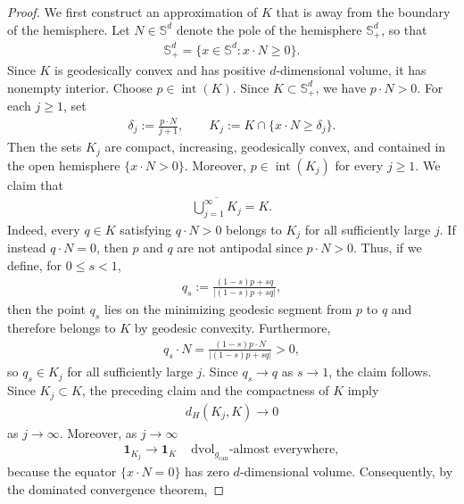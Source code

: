 \documentclass[11pt,reqno]{amsart}
\numberwithin{equation}{section}
\theoremstyle{definition}
\theoremstyle{remark}
\def\bS {\mathbb{S}}
\newcommand{\0}{\emptyset}
\newcommand{\can}{\mathrm{can}}
\newcommand{\dvol}{\,\mathrm{dvol}}
\begin{document}
\begin{proof}
We first construct an approximation of $K$ that is away from the boundary of the hemisphere. Let $N\in\bS^d$ denote the pole of the hemisphere $\bS^d_+$, so that
\begin{align}
        \bS^d_+
        =
        \{x\in\bS^d:x\cdot N\geq0\}.
\end{align}
Since $K$ is geodesically convex and has positive $d$-dimensional volume,
it has nonempty interior. Choose $p\in\operatorname{int}(K)$. Since $K\subset\bS^d_+$, we have
$p\cdot N>0$. For each $j\geq1$, set
\begin{align}
        \delta_j
        :=
        \frac{p\cdot N}{j+1},
        \qquad
        K_j
        :=
        K\cap\{x\cdot N\geq\delta_j\}.
\end{align}
Then the sets $K_j$ are compact, increasing, geodesically convex, and
contained in the open hemisphere $\{x\cdot N>0\}$. Moreover,
$p\in\operatorname{int}(K_j)$ for every $j\geq1$. We claim that
\begin{align}
        \overline{\bigcup_{j=1}^\infty K_j}
        =
        K.
\end{align}
Indeed, every $q\in K$ satisfying $q\cdot N>0$ belongs to $K_j$ for all
sufficiently large $j$. If instead $q\cdot N=0$, then $p$ and $q$ are not antipodal since $p\cdot N>0$. Thus, if we define, for $0\leq s<1$,
\begin{align}
        q_s
        :=
        \frac{(1-s)p+sq}{|(1-s)p+sq|},
\end{align}
then the point $q_s$ lies on the minimizing geodesic segment from $p$ to $q$ and
therefore belongs to $K$ by geodesic convexity. Furthermore,
\begin{align}
        q_s\cdot N
        =
        \frac{(1-s)p\cdot N}{|(1-s)p+sq|}
        >
        0,
\end{align}
so $q_s\in K_j$ for all sufficiently large $j$. Since $q_s\to q$ as
$s\to1$, the claim follows. Since $K_j\subset K$, the preceding claim and the compactness of $K$ imply
\begin{align}
        d_H(K_j,K)
        \rightarrow
        0
\end{align}
as $j\to \infty.$ Moreover, as $j\to \infty$
\begin{align}
        \mathbf{1}_{K_j}
        \rightarrow
        \mathbf{1}_K
        \quad
        \dvol_{g_{\can}}\text{-almost everywhere},
\end{align}
because the equator $\{x\cdot N=0\}$ has zero $d$-dimensional volume. Consequently, by the dominated convergence theorem,

\end{proof}
\end{document}
